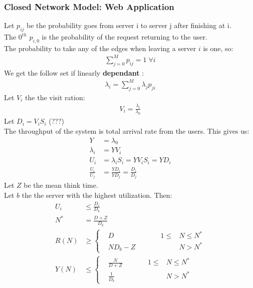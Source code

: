 \subsubsection{Closed Network Model: Web Application}
Let $p_{ij}$ be the probability goes from server i to server j after finishing at i. \\
The $0^{th}$ $p_{i,0}$ is the probability of the request returning to the user. \\
The probability to take any of the edges when leaving a server $i$ is one, so:
\begin{align*} 
	\sum_{j=0}^{M} p_{ij} = 1 \; \forall i
\end{align*}
We get the follow set if linearly {\bf dependant} :
\begin{align*} 
	\lambda_i = \sum_{j=0}^M \lambda_j p_{ji}
\end{align*} 
Let $V_i$ the the visit ration:
\begin{align*} 
	V_i = \frac{\lambda_i}{\lambda_0}
\end{align*} 
Let $D_i = V_i S_i$ (???) \\
The throughput of the system is total arrival rate from the users. This gives
us:
\begin{align*} 
	Y &= \lambda_0 \\
	\lambda_i &= Y V_i \\
	U_i &= \lambda_i S_i = Y V_i S_i = Y D_i \\
	\frac{U_i}{U_j} &= \frac{Y D_i}{Y D_j} = \frac{D_i}{D_j}
\end{align*} 
Let $Z$ be the mean think time. \\
Let $b$ the the server with the highest utilization. Then:
\begin{align*} 
	U_i & \le \frac{D_i}{D_b} \\
	N^* & =   \frac{D+Z}{D_b} \\
	R(N) & \ge 
	\left\{
		\begin{alignedat}{3}
			& D         & \qquad & 1 \le  & N \le N^* \\
			& N D_b -Z  & \qquad &        & N  >  N^*
		\end{alignedat}
	\right. \\
	Y(N) & \le
	\left\{
		\begin{alignedat}{3}
			& \frac{N}{D+Z}   &  \qquad & 1 \le  & N \le N^* \\
			& \frac{1}{D_b}   & \qquad  &        & N  >  N^*
		\end{alignedat}
	\right.
\end{align*} 












